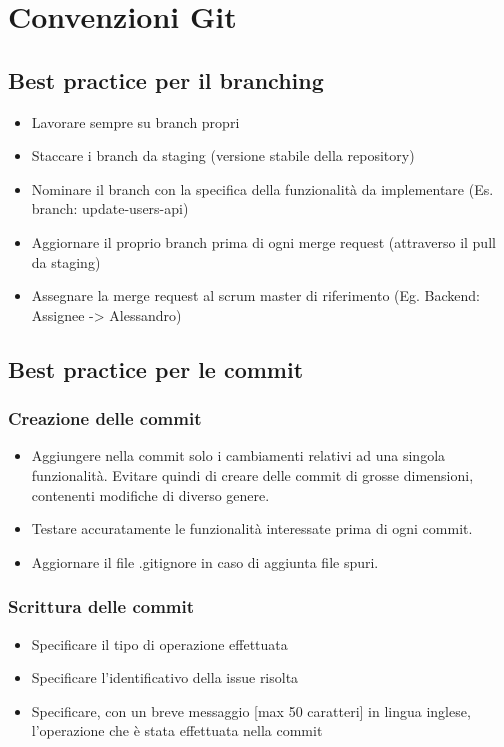 \chapter{Convenzioni Git}
\label{chap:convenzioni}


\section{Best practice per il branching}
    \begin{itemize}
        \item Lavorare sempre su branch propri
        \item Staccare i branch da staging (versione stabile della repository)
        \item Nominare il branch con la specifica della funzionalità da implementare (Es. branch: update-users-api)
        \item Aggiornare il proprio branch prima di ogni merge request (attraverso il pull da staging)
        \item Assegnare la merge request al scrum master di riferimento (Eg. Backend: Assignee -> Alessandro)
    \end{itemize}

\section{Best practice per le commit}
    \subsection{Creazione delle commit}
        \begin{itemize}
            \item Aggiungere nella commit solo i cambiamenti relativi ad una singola funzionalità. Evitare quindi di creare delle commit di grosse dimensioni, contenenti modifiche di diverso genere. 
            \item Testare accuratamente le funzionalità interessate prima di ogni commit.
            \item Aggiornare il file .gitignore in caso di aggiunta file spuri.
        \end{itemize}
    
    \subsection{Scrittura delle commit}
        \begin{itemize}
            \item Specificare il tipo di operazione effettuata
            \item Specificare l’identificativo della issue risolta
            \item Specificare, con un breve messaggio [max 50 caratteri] in lingua inglese, l’operazione che è stata effettuata nella commit 
        
        \end{itemize}

